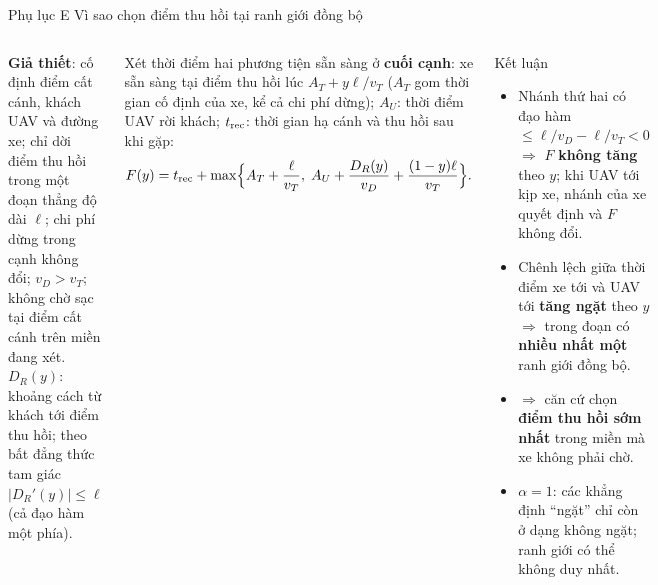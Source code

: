 \documentclass[aspectratio=169,10pt,t,xcolor={table}]{beamer}
\newcommand{\apptitle}[2]{Phụ lục #1 \textperiodcentered{} #2}
\begin{document}
\begin{frame}{\apptitle{E}{Vì sao chọn điểm thu hồi tại ranh giới đồng bộ}}
\begin{columns}[T,onlytextwidth]
\scriptsize
\textbf{Giả thiết}: cố định điểm cất cánh, khách UAV và đường xe; chỉ dời điểm thu hồi trong một đoạn thẳng độ dài $\ell$; chi phí dừng trong cạnh không đổi; $v_D>v_T$; không chờ sạc tại điểm cất cánh trên miền đang xét. $D_R(y)$: khoảng cách từ khách tới điểm thu hồi; theo bất đẳng thức tam giác $|D_R'(y)|\le\ell$ (cả đạo hàm một phía).
\vspace{3pt}

Xét thời điểm hai phương tiện sẵn sàng ở \textbf{cuối cạnh}: xe sẵn sàng tại điểm thu hồi lúc $A_T+y\ell/v_T$ ($A_T$ gom thời gian cố định của xe, kể cả chi phí dừng); $A_U$: thời điểm UAV rời khách; $t_{\rm rec}$: thời gian hạ cánh và thu hồi sau khi gặp:
\[
F(y)=t_{\rm rec}+\max\Bigl\{A_T+\frac{\ell}{v_T},\;
A_U+\frac{D_R(y)}{v_D}+\frac{(1-y)\ell}{v_T}\Bigr\}.
\]
\begin{block}{Kết luận}
\scriptsize
\begin{itemize}
\item Nhánh thứ hai có đạo hàm $\le \ell/v_D-\ell/v_T<0$ $\Rightarrow$ $F$ \textbf{không tăng} theo $y$; khi UAV tới kịp xe, nhánh của xe quyết định và $F$ không đổi.
\item Chênh lệch giữa thời điểm xe tới và UAV tới \textbf{tăng ngặt} theo $y$ $\Rightarrow$ trong đoạn có \textbf{nhiều nhất một} ranh giới đồng bộ.
\item $\Rightarrow$ căn cứ chọn \textbf{điểm thu hồi sớm nhất} trong miền mà xe không phải chờ.
\item $\alpha=1$: các khẳng định ``ngặt'' chỉ còn ở dạng không ngặt; ranh giới có thể không duy nhất.
\end{itemize}
\end{block}
\end{columns}
\end{frame}
\end{document}

